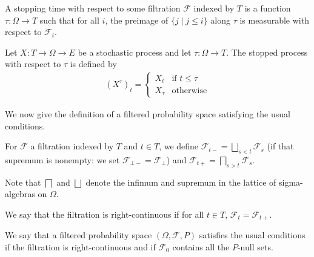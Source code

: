 \begin{definition}\label{def:IsStoppingTime}
  \mathlibok
A stopping time with respect to some filtration $\mathcal{F}$ indexed by $T$ is a function $\tau : \Omega \to T$ such that for all $i$, the preimage of $\{j \mid j \le i\}$ along $\tau$ is measurable with respect to $\mathcal{F}_i$.
\end{definition}


\begin{definition}\label{def:stoppedProcess}
  \mathlibok
Let $X : T \to \Omega \to E$ be a stochastic process and let $\tau : \Omega \to T$.
The stopped process with respect to $\tau$ is defined by
\begin{align*}
  (X^{\tau})_t = \begin{cases}
    X_t & \text{if } t \le \tau \\
    X_{\tau} & \text{otherwise}
  \end{cases}
\end{align*}
\end{definition}


We now give the definition of a filtered probability space satisfying the usual conditions.


\begin{definition}\label{def:leftRightLimitFiltration}
For $\mathcal{F}$ a filtration indexed by $T$ and $t \in T$, we define $\mathcal{F}_{t-} = \bigsqcup_{s < t} \mathcal{F}_s$ (if that supremum is nonempty: we set $\mathcal{F}_{\bot-} = \mathcal{F}_\bot$) and $\mathcal{F}_{t+} = \bigsqcap_{s > t} \mathcal{F}_s$.

Note that $\bigsqcap$ and $\bigsqcup$ denote the infimum and supremum in the lattice of sigma-algebras on $\Omega$.
\end{definition}


\begin{definition}\label{def:rightContinuous}
We say that the filtration is right-continuous if for all $t \in T$, $\mathcal{F}_t = \mathcal{F}_{t+}$.
\end{definition}


\begin{definition}\label{def:usualConditions}
We say that a filtered probability space $(\Omega, \mathcal{F}, P)$ satisfies the usual conditions if the filtration is right-continuous and if $\mathcal{F}_0$ contains all the $P$-null sets.
\end{definition}


